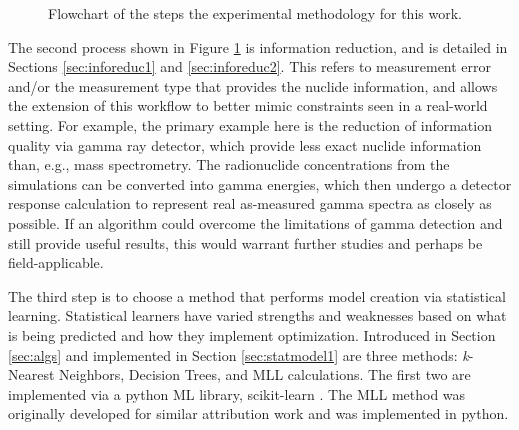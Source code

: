 \begin{figure}[!hbt]
  \caption{Flowchart of the steps the experimental methodology for this work.}
  \label{fig:intromethod}
\end{figure}

The second process shown in Figure \ref{fig:intromethod} is information
reduction, and is detailed in Sections \ref{sec:inforeduc1} and
\ref{sec:inforeduc2}.  This refers to measurement error and/or the measurement
type that provides the nuclide information, and allows the extension of this
workflow to better mimic constraints seen in a real-world setting.  For
example, the primary example here is the reduction of information quality via
gamma ray detector, which provide less exact nuclide information than, e.g.,
mass spectrometry.  The radionuclide concentrations from the simulations can be
converted into gamma energies, which then undergo a detector response
calculation to represent real as-measured gamma spectra as closely as possible.
If an algorithm could overcome the limitations of gamma detection and still
provide useful results, this would warrant further studies and perhaps be
field-applicable.

The third step is to choose a method that performs model creation via
statistical learning.  Statistical learners have varied strengths and
weaknesses based on what is being predicted and how they implement
optimization. Introduced in Section \ref{sec:algs} and implemented in Section
\ref{sec:statmodel1} are three methods: \textit{k}-Nearest Neighbors, Decision
Trees, and \gls{MLL} calculations. The first two are implemented via a python
\gls{ML} library, scikit-learn \cite{scikit}. The \gls{MLL} method was
originally developed for similar attribution work \cite{mll_method,
mll_sensitivity, mll_validate} and was implemented in python.

